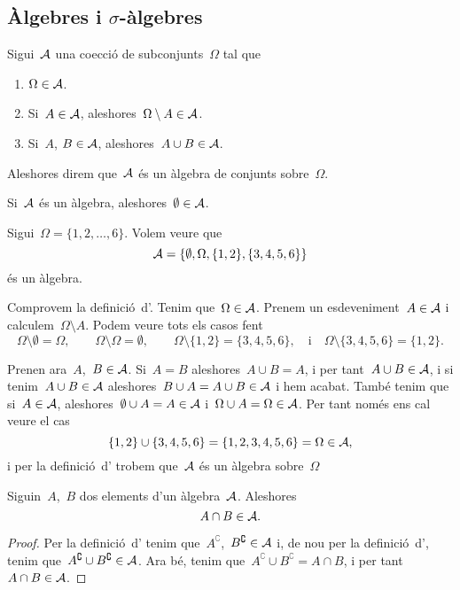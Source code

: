 \documentclass[../../Main.tex]{subfiles}
\begin{document}
\subsection{Àlgebres i \ensuremath{\sigma}-àlgebres}
	\begin{definition}[Àlgebra]
		\label{def:àlgebra}
		Sigui~\(\mathcal{A}\) una co{\lgem}ecció de subconjunts~\(\Omega\) tal que
		\begin{enumerate}
			\item \(\Omega\in\mathcal{A}\).
			\item Si~\(A\in\mathcal{A}\), aleshores~\(\Omega\setminus A\in\mathcal{A}\).
			\item Si~\(A\), \(B\in\mathcal{A}\), aleshores~\(A\cup B\in\mathcal{A}\).
		\end{enumerate}
		Aleshores direm que~\(\mathcal{A}\) és un àlgebra de conjunts sobre~\(\Omega\).
	\end{definition}
	\begin{observation}
		\label{obs:el conjunt buit pertany a qualsevol àlgebra}
		Si~\(\mathcal{A}\) és un àlgebra, aleshores~\(\emptyset\in\mathcal{A}\).
	\end{observation}
	\begin{example}
		\label{ex:exemple d'àlgebra}
		Sigui~\(\Omega=\{1,2,\dots,6\}\). Volem veure que
		\[\mathcal{A}=\{\emptyset,\Omega,\{1,2\},\{3,4,5,6\}\}\]
		és un àlgebra.
		\begin{solution}
			Comprovem la definició~d'. Tenim que~\(\Omega\in\mathcal{A}\). Prenem un esdeveniment~\(A\in\mathcal{A}\) i calculem~\(\Omega\setminus A\). Podem veure tots els casos fent
			\[
				\Omega\setminus\emptyset=\Omega,\qquad
				\Omega\setminus\Omega=\emptyset,\qquad
				\Omega\setminus\{1,2\}=\{3,4,5,6\},\quad\text{i}\quad
				\Omega\setminus\{3,4,5,6\}=\{1,2\}.
			\]
			
			Prenen ara~\(A\),~\(B\in\mathcal{A}\). Si~\(A=B\) aleshores~\(A\cup B=A\), i per tant~\(A\cup B\in\mathcal{A}\), i si tenim~\(A\cup B\in\mathcal{A}\) aleshores~\(B\cup A=A\cup B\in\mathcal{A}\) i hem acabat. També tenim que si~\(A\in\mathcal{A}\), aleshores~\(\emptyset\cup A=A\in\mathcal{A}\) i~\(\Omega\cup A=\Omega\in\mathcal{A}\). Per tant només ens cal veure el cas
			\[
				\{1,2\}\cup\{3,4,5,6\}=\{1,2,3,4,5,6\}=\Omega\in\mathcal{A},
			\]
			i per la definició~d' trobem que~\(\mathcal{A}\) és un àlgebra sobre~\(\Omega\)
		\end{solution}
	\end{example}
	\begin{proposition}
		\label{prop:les àlgebras són tancades per interseccions}
		Siguin~\(A\),~\(B\) dos elements d'un àlgebra~\(\mathcal{A}\). Aleshores
		\[A\cap B\in\mathcal{A}.\]
		\begin{proof}
			Per la definició~d' tenim que~\(A^{\complement}\),~\(B^{\complement}\in\mathcal{A}\) i, de nou per la definició~d', tenim que~\(A^{\complement}\cup B^{\complement}\in\mathcal{A}\). Ara bé,%
			tenim que~\(A^{\complement}\cup B^{\complement}=A\cap B\), i per tant~\(A\cap B\in\mathcal{A}\).
		\end{proof}
	\end{proposition}
\end{document}
